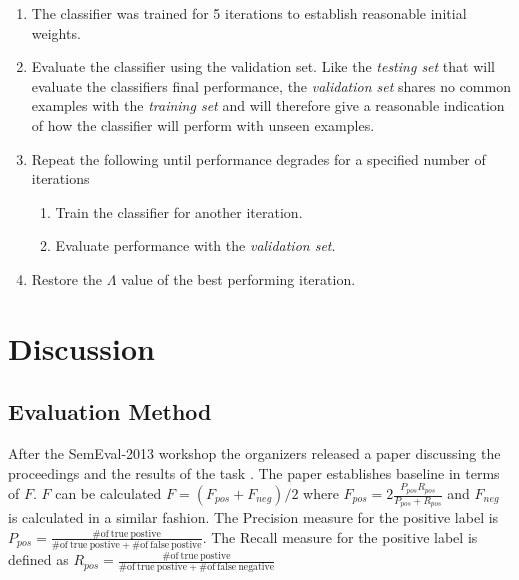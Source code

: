 \documentclass[12pt]{article}
\begin{document}
\begin{enumerate}

    \item The classifier was trained for 5 iterations to establish reasonable
        initial weights.

    \item Evaluate the classifier using the validation set. Like the
        \textit{testing set} that will evaluate the classifiers final
        performance, the \textit{validation set} shares no common examples with
        the \textit{training set} and will therefore give a reasonable
        indication of how the classifier will perform with unseen examples.

    \item Repeat the following until performance degrades for a specified
        number of iterations

    \begin{enumerate}

        \item Train the classifier for another iteration.

        \item Evaluate performance with the \textit{validation set}.

    \end{enumerate}

    \item Restore the $\Lambda$ value of the best performing iteration.

\end{enumerate}

\section{Discussion}

\subsection{Evaluation Method}

After the SemEval-2013 workshop the organizers released a paper discussing the
proceedings and the results of the task \cite{Nakov2013}. The paper establishes
baseline in terms of $F$. $F$ can be calculated $F = (F_{pos} + F_{neg}) / 2$
where $F_{pos} = 2 \frac{P_{pos}R_{pos}}{P_{pos} + R_{pos}}$ and $F_{neg}$ is
calculated in a similar fashion. The Precision measure for the positive label
is $P_{pos} = \frac{\mathrm{\# of\ true\ postive}}{\mathrm{\# of\ true\
postive} + \mathrm{\# of\ false\ postive} }$. The Recall measure for the
positive label is defined as $R_{pos} = \frac{\mathrm{\# of\ true\
postive}}{\mathrm{\# of\ true\ postive} + \mathrm{\# of\ false\ negative} }$
\end{document}
